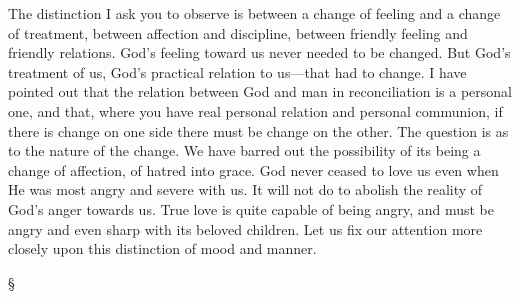 \documentclass[12pt,a5paper,twoside,titlepage]{book}
\begin{document}
The distinction I ask you to observe is 
between a change of feeling and a change of 
treatment, between affection and discipline, 
between friendly feeling and friendly relations. 
God's feeling toward us never needed to be 
changed. But God's treatment of us, God's 
practical relation to us---that had to change. I 
have pointed out that the relation between God 
and man in reconciliation is a personal one, and 
that, where you have real personal relation 
and personal communion, if there is change on 
one side there must be change on the other. 
The question is as to the nature of the change. 
We have barred out the possibility of its being a 
change of affection, of hatred into grace. God 
never ceased to love us even when He was most 
angry and severe with us. It will not do to 
abolish the reality of God's anger towards 
us. True love is quite capable of being angry, 
and must be angry and even sharp with its 
beloved children. Let us fix our attention 
more closely upon this distinction of mood and 
manner. 

\begin{center}
\S
\end{center}
\end{document}
